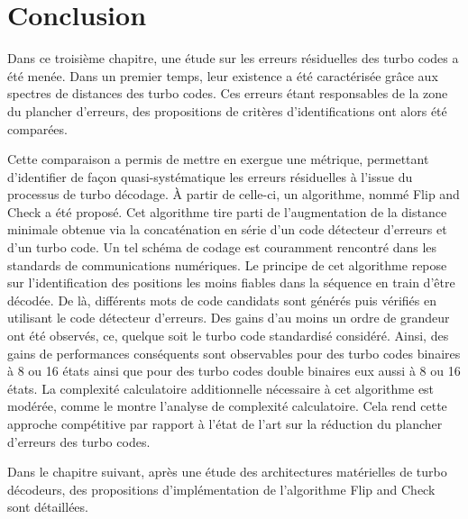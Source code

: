 \section{Conclusion}
Dans ce troisième chapitre, une étude sur les erreurs résiduelles des turbo codes a été menée. Dans un premier temps,
leur existence a été caractérisée grâce aux spectres de distances des turbo codes. Ces erreurs étant responsables de 
la zone du plancher d'erreurs, des propositions de critères d'identifications ont alors été comparées.

Cette comparaison a permis de mettre en exergue une métrique, permettant d'identifier de façon quasi-systématique
les erreurs résiduelles à l'issue du processus de turbo décodage. À partir de celle-ci, un algorithme, nommé Flip and Check
a été proposé. Cet algorithme tire parti de l'augmentation de la distance minimale obtenue via la concaténation en série 
d'un code détecteur d'erreurs et d'un turbo code. Un tel schéma de codage est couramment rencontré dans les standards de 
communications numériques. Le principe de cet algorithme repose sur l'identification des positions les moins fiables dans la séquence en train 
d'être décodée. De là, différents mots de code candidats sont générés puis vérifiés en utilisant le code détecteur d'erreurs.
Des gains d'au moins un ordre de grandeur ont été observés, ce, quelque soit le turbo code standardisé considéré. Ainsi, des gains
de performances conséquents sont observables pour des turbo codes binaires à 8 ou 16 états ainsi que pour des turbo codes 
double binaires eux aussi à 8 ou 16 états. La complexité calculatoire additionnelle nécessaire à cet algorithme est modérée,
comme le montre l'analyse de complexité calculatoire.
Cela rend cette approche compétitive par rapport à l’état de l'art sur la réduction du plancher d'erreurs des turbo codes.

Dans le chapitre suivant, après une étude des architectures matérielles de turbo décodeurs, des propositions d'implémentation 
de l'algorithme Flip and Check sont détaillées.



